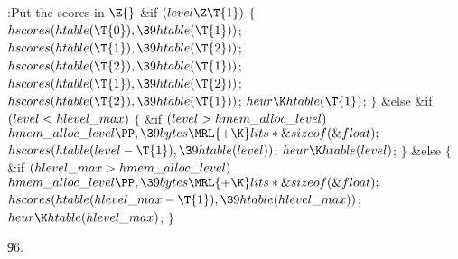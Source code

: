 \Y\B\4:Put the scores in \X${}\E{}$\6
\&{if} ${}(\\{level}\Z\T{1}){}$\5
${}\{{}$\1\6
${}\\{hscores}(\\{htable}(\T{0}),\39\\{htable}(\T{1})){}$;\6
${}\\{hscores}(\\{htable}(\T{1}),\39\\{htable}(\T{2})){}$;\6
${}\\{hscores}(\\{htable}(\T{2}),\39\\{htable}(\T{1})){}$;\6
${}\\{hscores}(\\{htable}(\T{1}),\39\\{htable}(\T{2})){}$;\6
${}\\{hscores}(\\{htable}(\T{2}),\39\\{htable}(\T{1})){}$;\6
${}\\{heur}\K\\{htable}(\T{1}){}$;\6
\4${}\}{}$\5
\2\&{else} \&{if} ${}(\\{level}<\\{hlevel\_max}){}$\5
${}\{{}$\1\6
\&{if} ${}(\\{level}>\\{hmem\_alloc\_level}){}$\1\5
${}\\{hmem\_alloc\_level}\PP,\39\\{bytes}\MRL{+{\K}}\\{lits}*\&{sizeof}(%
\&{float});{}$\2\6
${}\\{hscores}(\\{htable}(\\{level}-\T{1}),\39\\{htable}(\\{level})){}$;\6
${}\\{heur}\K\\{htable}(\\{level}){}$;\6
\4${}\}{}$\5
\2\&{else}\5
${}\{{}$\1\6
\&{if} ${}(\\{hlevel\_max}>\\{hmem\_alloc\_level}){}$\1\5
${}\\{hmem\_alloc\_level}\PP,\39\\{bytes}\MRL{+{\K}}\\{lits}*\&{sizeof}(%
\&{float});{}$\2\6
${}\\{hscores}(\\{htable}(\\{hlevel\_max}-\T{1}),\39\\{htable}(\\{hlevel%
\_max})){}$;\6
${}\\{heur}\K\\{htable}(\\{hlevel\_max}){}$;\6
\4${}\}{}$\2\par
\U96.\fi

